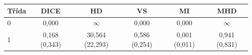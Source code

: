 \begin{tabular}{l c c c c c}
 \hline
Třída & DICE & HD & VS & MI & MHD \\ \hline
0 & 0,000 & $\infty$ & 0,000 & 0,000 & $\infty$ \\
1 & 0,168 (0,343) & 30,564 (22,293) & 0,586 (0,254) & 0,001 (0,011) & 0,941 (0,831) \\
\hline 
 \end{tabular}
